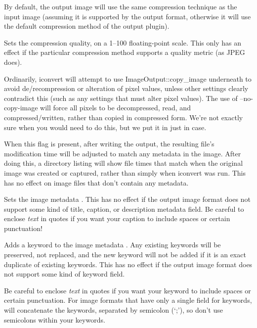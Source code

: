 By default, the output image will use the same compression technique as
the input image (assuming it is supported by the output format,
otherwise it will use the default compression method of the output
plugin).  
\apiend

Sets the compression quality, on a 1--100 floating-point scale.
This only has an effect if the particular compression method supports
a quality metric (as JPEG does).
\apiend

Ordinarily, {\cf iconvert} will attempt to use {\cf
  ImageOutput::copy_image}
underneath to avoid de/recompression or alteration of pixel values,
unless other settings clearly contradict this (such as any settings
that must alter pixel values).  The use of {\cf --no-copy-image} will
force all pixels to be decompressed, read, and compressed/written,
rather than copied in compressed form.  We're not exactly sure when
you would need to do this, but we put it in just in case.
\apiend

When this flag is present, after writing the output, the resulting
file's modification time will be adjusted to match any 
metadata in the image.  After doing this, a directory listing will show
file times that match when the original image was created or captured,
rather than simply when {\cf iconvert} was run.  This has no effect on
image files that don't contain any  metadata.
\apiend

Sets the image metadata .
This has no effect if the output image format does not support some kind
of title, caption, or description metadata field.
Be careful to enclose \emph{text} in quotes if you want your caption to
include spaces or certain punctuation!
\apiend

Adds a keyword to the image metadata .  Any existing
keywords will be preserved, not replaced, and the new keyword will not
be added if it is an exact duplicate of existing keywords.  This has no
effect if the output image format does not support some kind of keyword
field.  

Be careful to enclose \emph{text} in quotes if you want your keyword to
include spaces or certain punctuation.  For image formats that have only
a single field for keywords, \OpenImageIO will concatenate the keywords,
separated by semicolon (`;'), so don't use semicolons within your
keywords.
\apiend

